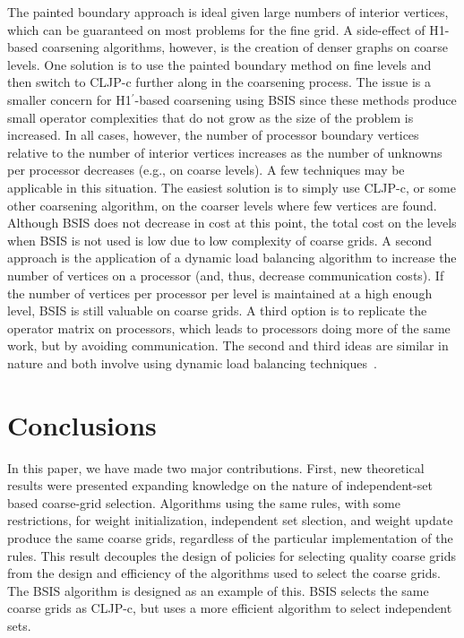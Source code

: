 \documentclass{elsart}
\begin{document}
The painted boundary approach is ideal given large numbers of interior
vertices, which can be guaranteed on most problems for the fine grid.
A side-effect of H1-based coarsening algorithms, however, is the
creation of denser graphs on coarse levels. One solution is to use the
painted boundary method on fine levels and then switch to CLJP-c
further along in the coarsening process. The issue is a smaller
concern for H1$^\prime$-based coarsening using BSIS since these
methods produce small operator complexities that do not grow as the
size of the problem is increased. In all cases, however, the number of
processor boundary vertices relative to the number of interior
vertices increases as the number of unknowns per processor decreases
(e.g., on coarse levels). A few techniques may be applicable in this
situation. The easiest solution is to simply use CLJP-c, or some other
coarsening algorithm, on the coarser levels where few vertices are
found. Although BSIS does not decrease in cost at this point, the
total cost on the levels when BSIS is not used is low due to low
complexity of coarse grids. A second approach is the application of a
dynamic load balancing algorithm to increase the number of vertices on
a processor (and, thus, decrease communication costs). If the number
of vertices per processor per level is maintained at a high enough
level, BSIS is still valuable on coarse grids. A third option is to
replicate the operator matrix on processors, which leads to processors
doing more of the same work, but by avoiding communication. The second
and third ideas are similar in nature and both involve using dynamic
load balancing
techniques~\cite{DevineBomanKarypisPP04,CybDLB,deCoughnyLB,SchloegelLB,ZoltanParHyp06ipdps,ZoltanParHypRepart07}.

\section{Conclusions}
\label{sec:conclusions}
In this paper, we have made two major contributions. First, new
theoretical results were presented expanding knowledge on the nature
of independent-set based coarse-grid selection. Algorithms using the
same rules, with some restrictions, for weight initialization,
independent set slection, and weight update produce the same coarse
grids, regardless of the particular implementation of the
rules. This result decouples the design of policies for selecting
quality coarse grids from the design and efficiency of the algorithms
used to select the coarse grids. The BSIS algorithm is designed as an
example of this. BSIS selects the same coarse grids as CLJP-c, but
uses a more efficient algorithm to select independent sets.



\end{document}
